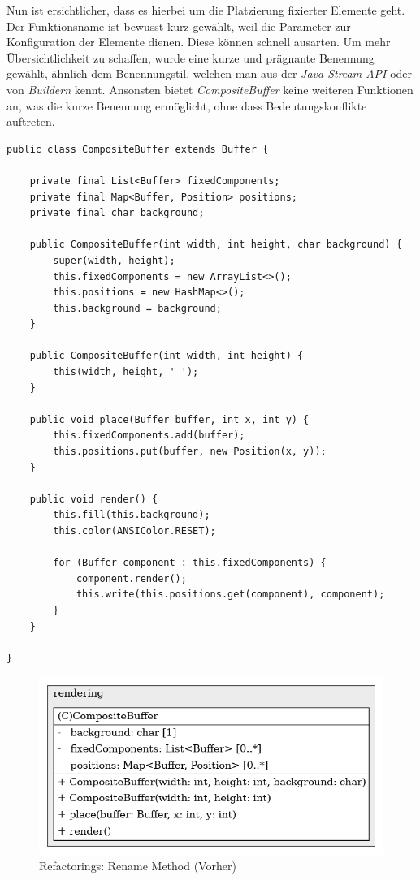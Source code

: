 Nun ist ersichtlicher, dass es hierbei um die Platzierung fixierter
Elemente geht. Der Funktionsname ist bewusst kurz gewählt, weil
die Parameter zur Konfiguration der Elemente dienen. Diese können
schnell ausarten. Um mehr Übersichtlichkeit zu schaffen, wurde eine
kurze und prägnante Benennung gewählt, ähnlich dem Benennungstil,
welchen man aus der \textit{Java Stream API} oder von \textit{Buildern}
kennt. Ansonsten bietet \textit{CompositeBuffer} keine weiteren
Funktionen an, was die kurze Benennung ermöglicht, ohne dass
Bedeutungskonflikte auftreten.

\vspace{0.5cm}
\begin{lstlisting}[caption={Refactorings: Rename Method (Vorher)}]
public class CompositeBuffer extends Buffer {
    
    private final List<Buffer> fixedComponents;
    private final Map<Buffer, Position> positions;
    private final char background;
    
    public CompositeBuffer(int width, int height, char background) {
        super(width, height);
        this.fixedComponents = new ArrayList<>();
        this.positions = new HashMap<>();
        this.background = background;
    }
    
    public CompositeBuffer(int width, int height) {
        this(width, height, ' ');
    }
    
    public void place(Buffer buffer, int x, int y) {
        this.fixedComponents.add(buffer);
        this.positions.put(buffer, new Position(x, y));
    }
    
    public void render() {
        this.fill(this.background);
        this.color(ANSIColor.RESET);
        
        for (Buffer component : this.fixedComponents) {
            component.render();
            this.write(this.positions.get(component), component);
        }
    }
    
}
\end{lstlisting}

\vspace{0.5cm}
\begin{figure}[H]
    \centering
    \includegraphics[width=0.6\linewidth]{Bilder/Visualisierung/CompositeBufferPlaceFunction_structure.png}
    \caption{Refactorings: Rename Method (Vorher)}
\end{figure}

